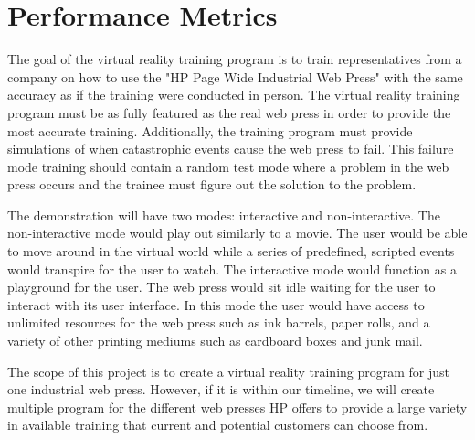 \documentclass[draftclsnofoot,onecolumn]{IEEEtran}
\begin{document}
\section{Performance Metrics}
The goal of the virtual reality training program is to train representatives from a company on how to use the "HP Page Wide Industrial Web Press" with the same accuracy as if the training were conducted in person. The virtual reality training program must be as fully featured as the real web press in order to provide the most accurate training. Additionally, the training program must provide simulations of when catastrophic events cause the web press to fail. This failure mode training should contain a random test mode where a problem in the web press occurs and the trainee must figure out the solution to the problem.

The demonstration will have two modes: interactive and non-interactive. The non-interactive mode would play out similarly to a movie. The user would be able to move around in the virtual world while a series of predefined, scripted events would transpire for the user to watch. The interactive mode would function as a playground for the user. The web press would sit idle waiting for the user to interact with its user interface. In this mode the user would have access to unlimited resources for the web press such as ink barrels, paper rolls, and a variety of other printing mediums such as cardboard boxes and junk mail.

The scope of this project is to create a virtual reality training program for just one industrial web press. However, if it is within our timeline, we will create multiple program for the different web presses HP offers to provide a large variety in available training that current and potential customers can choose from.
\end{document}
